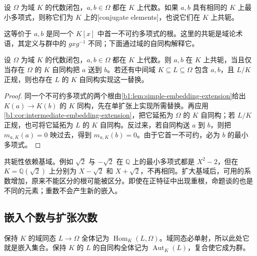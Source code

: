 \begin{definition}\label{b1:def:field-conjugate-elements}
	设 \(\Omega\) 为域 \(K\) 的代数闭包，\(a,b\in\Omega\) 都在 \(K\) 上代数。如果 \(a,b\) 具有相同的 \(K\) 上最小多项式，则称它们为 \(K\) 上的[conjugate elements]，也说它们在 \(K\) 上共轭。
\end{definition}
这等价于 \(a,b\) 是同一个 \(K[x]\) 中首一不可约多项式的根。这里的共轭是域论术语，其定义与群中的 \(gxg^{-1}\) 不同；下面通过域的自同构解释它。

\begin{proposition}\label{b1:prop:conjugates-automorphism}
	设 \(\Omega\) 为域 \(K\) 的代数闭包，\(a,b\in\Omega\) 都在 \(K\) 上代数。则 \(a,b\) 在 \(K\) 上共轭，当且仅当存在 \(\Omega\) 的 \(K\) 自同构把 \(a\) 送到 \(b\)。若还有中间域 \(K\subseteq L\subseteq\Omega\) 包含 \(a,b\)，且 \(L/K\) 正规，则也存在 \(L\) 的 \(K\) 自同构实现这一替换。
\end{proposition}
\begin{proof}
	同一个不可约多项式的两个根由\cref{b1:lem:simple-embedding-extension}给出 \(K(a)\rightarrow K(b)\) 的 \(K\) 同构，先在单扩张上实现所需替换。再应用\cref{b1:cor:intermediate-embedding-extension}，把它延拓为 \(\Omega\) 的 \(K\) 自同构；若 \(L/K\) 正规，也可将它延拓为 \(L\) 的 \(K\) 自同构。反过来，若自同构送 \(a\) 到 \(b\)，则把 \(m_{a,K}(a)=0\) 映过去，得到 \(m_{a,K}(b)=0\)。由于它首一不可约，必为 \(b\) 的最小多项式。
\end{proof}
共轭性依赖基域。例如 \(\sqrt2\) 与 \(-\sqrt2\) 在 \(\mathbb Q\) 上的最小多项式都是 \(X^2-2\)，但在 \(K=\mathbb Q(\sqrt2)\) 上分别为 \(X-\sqrt2\) 和 \(X+\sqrt2\)，不再相同。扩大基域后，可用的系数增加，原来不能区分的根可能被区分。即使在正特征中出现重根，命题谈的也是不同的元素；重数不会产生新的嵌入。

\subsection{嵌入个数与扩张次数}
\label{b1:subsec:1504:03}

保持 \(K\) 的域同态 \(L\rightarrow\Omega\) 全体记为 \(\operatorname{Hom}_K(L,\Omega)\)。域同态必单射，所以此处它就是嵌入集合。保持 \(K\) 的 \(L\) 的自同构全体记为 \(\operatorname{Aut}_K(L)\)，复合使它成为群。

